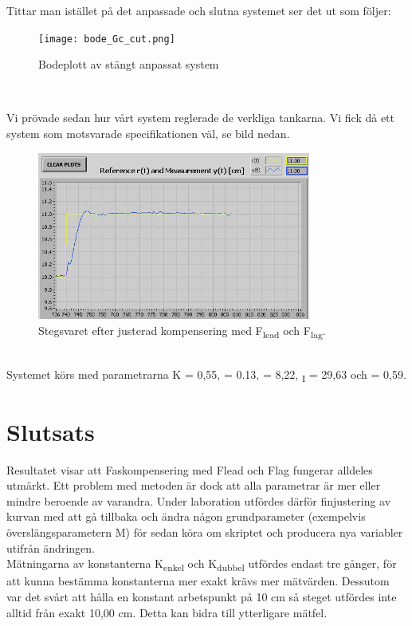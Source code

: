 \documentclass[a4wide]{article}
\begin{document}
\newpage

Tittar man istället på det anpassade och slutna systemet ser det ut som följer: 

\begin{figure}[ht!]
\centering
\texttt{[image: bode\_Gc\_cut.png]}
\caption{Bodeplott av stängt anpassat system}
\label{overflow}
\end{figure}
~\\

\newpage

Vi prövade sedan hur vårt system reglerade de verkliga tankarna. Vi fick då ett system som motsvarade specifikationen väl, se bild nedan.

\begin{figure}[ht!]
\centering
\includegraphics[width=90mm]{Test3_cut.jpg}
\caption{Stegsvaret efter justerad kompensering med F\textsubscript{lead} och F\textsubscript{lag}.}
\label{overflow}
\end{figure}
~\\
Systemet körs med parametrarna K = 0,55, \textbeta = 0.13,  = 8,22, {\textsubscript{I}} = 29,63 och \textgamma = 0,59. 


\newpage
\section{Slutsats}
Resultatet visar att Faskompensering med Flead och Flag fungerar alldeles utmärkt. Ett problem med metoden är dock att alla parametrar är mer eller mindre beroende av varandra. Under laboration utfördes därför finjustering av kurvan med att gå tillbaka och ändra någon grundparameter (exempelvis överslängsparametern M) för sedan köra om skriptet och producera nya variabler utifrån ändringen.
\\
\newline
Mätningarna av konstanterna K\textsubscript{enkel} och K\textsubscript{dubbel} utfördes endast tre gånger, för att kunna bestämma konstanterna mer exakt krävs mer mätvärden. Dessutom var det svårt att hålla en konstant arbetspunkt på 10 cm så steget utfördes inte alltid från exakt 10,00 cm. Detta kan bidra till ytterligare mätfel.
\end{document}
